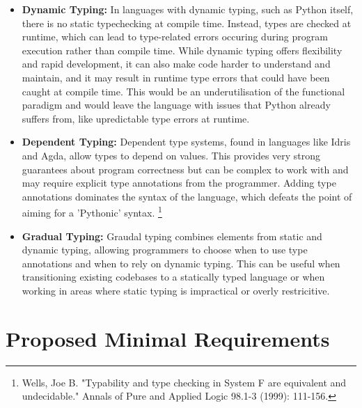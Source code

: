 \documentclass{l4proj}
\begin{document}
\begin{itemize}
    \item \textbf{Dynamic Typing:} In languages with dynamic typing, such as Python itself, there is no static typechecking at compile time.
    Instead, types are checked at runtime, which can lead to type-related errors occuring during program execution rather than compile time. 
    While dynamic typing offers flexibility and rapid development, it can also make code harder to understand and maintain, and it may result in runtime type errors that could have been caught at compile time.
    This would be an underutilisation of the functional paradigm and would leave the language with issues that Python already suffers from, like upredictable type errors at runtime.
    \item \textbf{Dependent Typing:} Dependent type systems, found in languages like Idris and Agda, allow types to depend on values.
    This provides very strong guarantees about program correctness but can be complex to work with and may require explicit type annotations from the programmer.
    Adding type annotations dominates the syntax of the language, which defeats the point of aiming for a 'Pythonic' syntax. \footnote{Wells, Joe B. "Typability and type checking in System F are equivalent and undecidable." Annals of Pure and Applied Logic 98.1-3 (1999): 111-156.}
    \item \textbf{Gradual Typing:} Graudal typing combines elements from static and dynamic typing, allowing programmers to choose when to use type annotations and when to rely on dynamic typing.
    This can be useful when transitioning existing codebases to a statically typed language or when working in areas where static typing is impractical or overly restricitive.
\end{itemize}



\section{Proposed Minimal Requirements}
\end{document}
